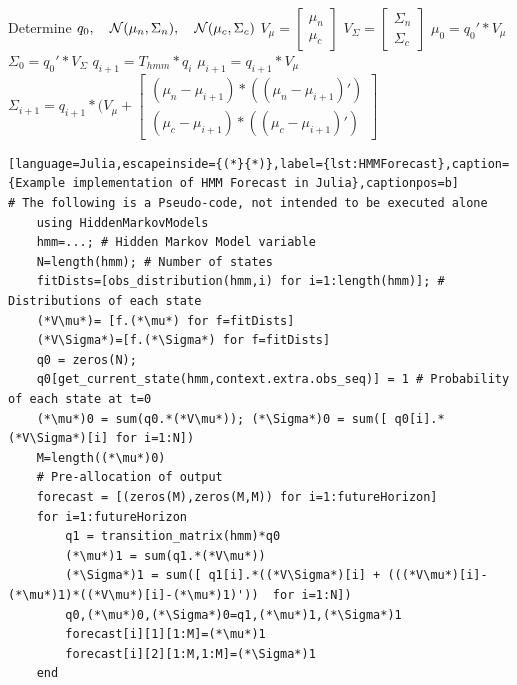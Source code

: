 \begin{algorithm} \label{algo::HMMForecast}
    \caption{\ac{HMM} Forecast}
  \begin{algorithmic}[1]
  \Require Determine $q_0,\quad \mathcal{N}(\mu_{n},\Sigma_{n}),\quad\mathcal{N}(\mu_{c},\Sigma_{c})$
  \State $V_\mu = \begin{bmatrix} \mu_n \\ \mu_c\end{bmatrix}$   
  \State $V_\Sigma = \begin{bmatrix} \Sigma_n \\ \Sigma_c\end{bmatrix}$   
  \State $\mu_0 = q_0'*V_\mu$
  \State $\Sigma_0 = q_0'*V_\Sigma$ 
        \State $q_{i+1} = T_{hmm}*q_i$ 
        \State $\mu_{i+1} = q_{i+1}*V_\mu$
        \State $\Sigma_{i+1} = q_{i+1}*(V_\mu + \begin{bmatrix}
           (\mu_n-\mu_{i+1})*((\mu_n-\mu_{i+1})') \\
           (\mu_c-\mu_{i+1})*((\mu_c-\mu_{i+1})')
        \end{bmatrix}$
    \EndFor
  \end{algorithmic}
\end{algorithm}


\begin{lstlisting}[language=Julia,escapeinside={(*}{*)},label={lst:HMMForecast},caption={Example implementation of HMM Forecast in Julia},captionpos=b]
# The following is a Pseudo-code, not intended to be executed alone
    using HiddenMarkovModels
    hmm=...; # Hidden Markov Model variable
    N=length(hmm); # Number of states
    fitDists=[obs_distribution(hmm,i) for i=1:length(hmm)]; # Distributions of each state
    (*V\mu*)= [f.(*\mu*) for f=fitDists]
    (*V\Sigma*)=[f.(*\Sigma*) for f=fitDists]
    q0 = zeros(N);
    q0[get_current_state(hmm,context.extra.obs_seq)] = 1 # Probability of each state at t=0
    (*\mu*)0 = sum(q0.*(*V\mu*)); (*\Sigma*)0 = sum([ q0[i].*(*V\Sigma*)[i] for i=1:N])
    M=length((*\mu*)0) 
    # Pre-allocation of output
    forecast = [(zeros(M),zeros(M,M)) for i=1:futureHorizon] 
    for i=1:futureHorizon
        q1 = transition_matrix(hmm)*q0
        (*\mu*)1 = sum(q1.*(*V\mu*))
        (*\Sigma*)1 = sum([ q1[i].*((*V\Sigma*)[i] + (((*V\mu*)[i]-(*\mu*)1)*((*V\mu*)[i]-(*\mu*)1)'))  for i=1:N]) 
        q0,(*\mu*)0,(*\Sigma*)0=q1,(*\mu*)1,(*\Sigma*)1
        forecast[i][1][1:M]=(*\mu*)1
        forecast[i][2][1:M,1:M]=(*\Sigma*)1
    end
\end{lstlisting}


